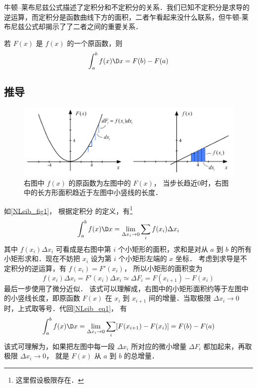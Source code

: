 

牛顿--莱布尼兹公式描述了定积分和不定积分的关系．我们已知不定积分是求导的逆运算，而定积分是函数曲线下方的面积，二者乍看起来没什么联系，但牛顿-莱布尼兹公式却揭示了了二者之间的重要关系．

若 $F(x)$ 是 $f(x)$ 的一个原函数，则
\begin{equation}\label{NLeib_eq1}
\int_a^b {f(x)\D x}  = F(b) - F(a)
\end{equation}

\subsection{推导}
\begin{figure}[ht]
\centering
\includegraphics[width=13cm]{./figures/NLeib.pdf}
\caption{右图中 $f(x)$ 的原函数为左图中的 $F(x)$， 当步长趋近0时，右图中的长方形面积趋近于左图中小竖线的长度．}\label{NLeib_fig1}
\end{figure}

如\autoref{NLeib_fig1}， 根据定积分 的定义，有\footnote{这里假设极限存在．}
\begin{equation}
\int_a^b f(x)\D x= \lim_{\Delta x_i\to 0}\sum_i f(x_i)\Delta x_i
\end{equation}
其中 $f(x_i)\Delta x_i$ 可看成是右图中第 $i$ 个小矩形的面积，求和是对从 $a$ 到 $b$ 的所有小矩形求和．现在不妨把 $x_i$ 设为第 $i$ 个小矩形左端的 $x$ 坐标． 考虑到求导是不定积分的逆运算，有 $f(x_i)=F'(x_i)$， 所以小矩形的面积变为
\begin{equation}
f(x_i)\Delta x_i = F'(x_i)\Delta x_i \simeq \Delta F_i = F(x_{i+1})-F(x_i)
\end{equation}
最后一步使用了微分近似． %
该式可以理解成，右图中的小矩形面积约等于左图中的小竖线长度，即原函数 $F(x)$ 在 $x_i$ 到 $x_{i+1}$ 间的增量．当取极限 $\Delta x_i \to 0$ 时，上式取等号．代回\autoref{NLeib_eq1}， 有
\begin{equation}
\int_a^b f(x)\D x= \lim_{\Delta x_i\to 0}\sum_i [F(x_{i+1})-F(x_i)] = F(b)-F(a)
\end{equation}
该式可理解为，如果把左图中每一段 $\Delta x_i$ 所对应的微小增量 $\Delta F_i$ 都加起来，再取极限 $\Delta x_i \to 0$， 就是 $F(x)$ 从 $a$ 到 $b$ 的总增量．


